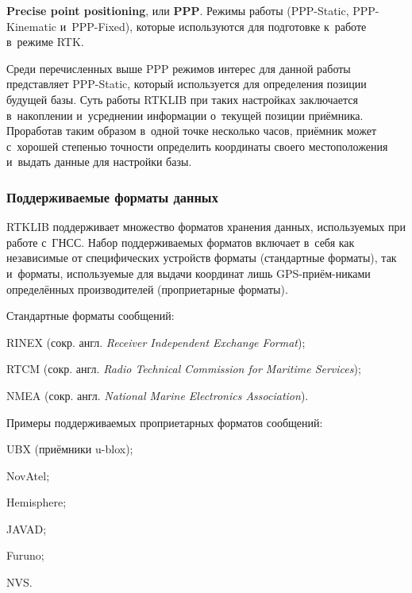 \begin{dashitemize}
  \item \textbf{Precise point positioning}, или \textbf{PPP}. Режимы работы (PPP-Static, PPP-Kinematic и~PPP-Fixed), которые используются для подготовке к~работе в~режиме RTK. \par
  Среди перечисленных выше PPP режимов интерес для данной работы представляет PPP-Static, который используется для определения позиции будущей базы. Суть работы RTKLIB при таких настройках заключается в~накоплении и~усреднении информации о~текущей позиции приёмника. Проработав таким образом в~одной точке несколько часов, приёмник может с~хорошей степенью точности определить координаты своего местоположения и~выдать данные для настройки базы.
\end{dashitemize}

\subsubsection{Поддерживаемые форматы данных}
\label{subsec:rtklib-data-formats}

RTKLIB поддерживает множество форматов хранения данных, используемых при работе с~ГНСС. Набор поддерживаемых форматов включает в~себя как независимые от специфических устройств форматы (стандартные форматы), так и~форматы, используемые для выдачи координат лишь GPS-приём-никами определённых производителей (проприетарные форматы). \par

Стандартные форматы сообщений:
\begin{dashitemize}
  \item RINEX (сокр. англ. \emph{Receiver Independent Exchange Format});
  \item RTCM (сокр. англ. \emph{Radio Technical Commission for Maritime Services});
  \item NMEA (сокр. англ. \emph{National Marine Electronics Association}).
\end{dashitemize}

Примеры поддерживаемых проприетарных форматов сообщений:
\begin{dashitemize}
  \item UBX (приёмники u-blox);
  \item NovAtel;
  \item Hemisphere;
  \item JAVAD;
  \item Furuno;
  \item NVS.
\end{dashitemize}

